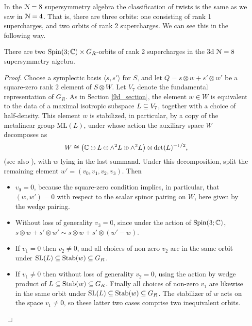 \documentclass[10pt, oneside]{article}
\newcommand{\ML}{\mathrm{ML}}
\begin{document}
In the $\mathcal{N}=8$ supersymmetry algebra the classification of twists is the same as we saw in $\mathcal{N}=4$.  That is, there are three orbits: one consisting of rank 1 supercharges, and two orbits of rank 2 supercharges.  We can see this in the following way.
\begin{lemma}
There are two $\mathrm{Spin}(3;\mathbb C) \times G_R$-orbits of rank 2 supercharges in the 3d $\mathcal{N}=8$ supersymmetry algebra.
\end{lemma}

\begin{proof}
Choose a symplectic basis $\langle s, s' \rangle$ for $S$, and let $Q = s \otimes w + s' \otimes w'$ be a square-zero rank 2 element of $S \otimes W$.  Let $V_7$ denote the fundamental representation of $G_R$.  As in Section \ref{9d_section}, the element $w \in W$ is equivalent to the data of a maximal isotropic subspace $L \subseteq V_7$, together with a choice of half-density.  This element $w$ is stabilized, in particular, by a copy of the metalinear group $\ML(L)$, under whose action the auxiliary space $W$ decomposes as
\[W \cong \left(\mathbb C \oplus L \oplus \wedge^2 L \oplus \wedge^3 L \right) \otimes \det(L)^{-1/2},\]
(see also \cite[Section 4.7]{ElliottSafronov}), with $w$ lying in the last summand.  Under this decomposition, split the remaining element $w' = (v_0, v_1, v_2, v_3)$.  Then
\begin{itemize}
 \item $v_0 = 0$, because the square-zero condition implies, in particular, that $(w,w') = 0$ with respect to the scalar spinor pairing on $W$, here given by the wedge pairing.
 \item Without loss of generality $v_3 = 0$, since under the action of $\mathrm{Spin}(3;\mathbb C)$, $s \otimes w + s' \otimes w' \sim s \otimes w + s' \otimes (w'-w)$.
 \item If $v_1 = 0$ then $v_2 \ne 0$, and all choices of non-zero $v_2$ are in the same orbit under $\mathrm{SL}(L) \subseteq \operatorname{Stab}(w) \subseteq G_R$.
 \item If $v_1 \ne 0$ then without loss of generality $v_2 = 0$, using the action by wedge product of $L \subseteq \operatorname{Stab}(w) \subseteq G_R$.  Finally all choices of non-zero $v_1$ are likewise in the same orbit under $\mathrm{SL}(L) \subseteq \operatorname{Stab}(w) \subseteq G_R$.  The stabilizer of $w$ acts on the space $v_1 \ne 0$, so these latter two cases comprise two inequivalent orbits.
\end{itemize}
\end{proof}
\end{document}
